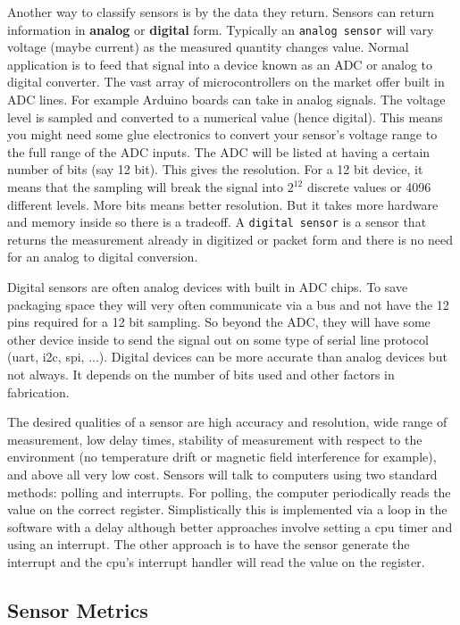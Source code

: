 Another way to classify sensors is by the data they return. Sensors can
return information in \textbf{analog} or \textbf{digital} form.
Typically an \texttt{analog\ sensor} will vary voltage (maybe current)
as the measured quantity changes value. Normal application is to feed
that signal into a device known as an ADC or analog to digital
converter. The vast array of microcontrollers on the market offer built
in ADC lines. For example Arduino boards can take in analog signals. The
voltage level is sampled and converted to a numerical value (hence
digital). This means you might need some glue electronics to convert
your sensor's voltage range to the full range of the ADC inputs. The ADC
will be listed at having a certain number of bits (say 12 bit). This
gives the resolution. For a 12 bit device, it means that the sampling
will break the signal into \(2^{12}\) discrete values or 4096 different
levels. More bits means better resolution. But it takes more hardware
and memory inside so there is a tradeoff. A \texttt{digital\ sensor} is
a sensor that returns the measurement already in digitized or packet
form and there is no need for an analog to digital conversion.

Digital sensors are often analog devices with built in ADC chips. To
save packaging space they will very often communicate via a bus and not
have the 12 pins required for a 12 bit sampling. So beyond the ADC, they
will have some other device inside to send the signal out on some type
of serial line protocol (uart, i2c, spi, ...). Digital devices can be
more accurate than analog devices but not always. It depends on the
number of bits used and other factors in fabrication.

The desired qualities of a sensor are high accuracy and resolution, wide
range of measurement, low delay times, stability of measurement with
respect to the environment (no temperature drift or magnetic field
interference for example), and above all very low cost. Sensors will
talk to computers using two standard methods: polling and interrupts.
For polling, the computer periodically reads the value on the correct
register. Simplistically this is implemented via a loop in the software
with a delay although better approaches involve setting a cpu timer and
using an interrupt. The other approach is to have the sensor generate
the interrupt and the cpu's interrupt handler will read the value on the
register.

\hypertarget{sensor-metrics}{%
\subsection{Sensor Metrics}\label{sensor-metrics}}

